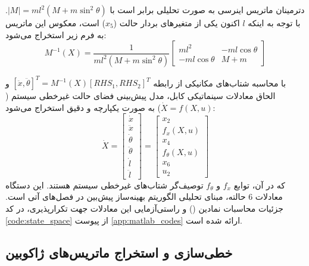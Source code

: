 دترمینان ماتریس اینرسی به صورت تحلیلی برابر است با $|M| = m l^2(M+m\sin^2\theta)$. با توجه به اینکه $l$ اکنون یکی از متغیرهای بردار حالت ($x_5$) است، معکوس این ماتریس به فرم زیر استخراج می‌شود:
\begin{equation}
    M^{-1}(X) = \frac{1}{m l^2 (M + m \sin^2 \theta)}
    \begin{bmatrix}
        m l^2            & -m l \cos \theta \\
        -m l \cos \theta & M+m
    \end{bmatrix}
\end{equation}

با محاسبه شتاب‌های مکانیکی از رابطه $[\ddot{x}, \ddot{\theta}]^T = M^{-1}(X) [RHS_1, RHS_2]^T$ و الحاق معادلات سینماتیکی کابل، مدل پیش‌بینی فضای حالت غیرخطی سیستم ($\dot{X} = f(X,u)$) به صورت یکپارچه و دقیق استخراج می‌شود:
\begin{equation}
    \dot{X} =
    \begin{bmatrix}
        \dot{x}       \\
        \ddot{x}      \\
        \dot{\theta}  \\
        \ddot{\theta} \\
        \dot{l}       \\
        \ddot{l}
    \end{bmatrix} =
    \begin{bmatrix}
        x_2           \\
        f_x(X,u)      \\
        x_4           \\
        f_\theta(X,u) \\
        x_6           \\
        u_2
    \end{bmatrix}
\end{equation}
که در آن، توابع $f_x$ و $f_\theta$ توصیف‌گر شتاب‌های غیرخطی سیستم هستند. این دستگاه معادلات $6$ حالته، مبنای تحلیلی الگوریتم بهینه‌ساز پیش‌بین در فصل‌های آتی است. جزئیات محاسبات نمادین () و راستی‌آزمایی این معادلات جهت تکرارپذیری، در کد \ref{code:state_space} از پیوست \ref{app:matlab_codes} ارائه شده است.

\subsection{خطی‌سازی و استخراج ماتریس‌های ژاکوبین}

